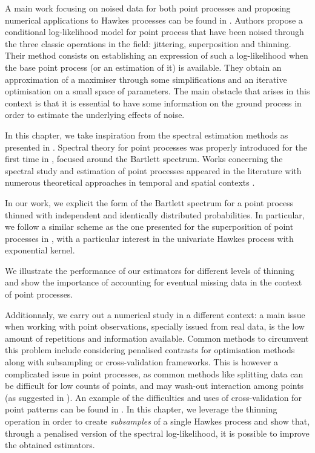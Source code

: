 A main work focusing on noised data for both point processes and proposing numerical applications to Hawkes processes can be found in \textcite{Lund2000}. 
Authors propose a conditional log-likelihood model for point process that have been noised through the three classic operations in the field: jittering, superposition and thinning. 
Their method consists on establishing an expression of such a log-likelihood when the base point process (or an estimation of it) is available.
They obtain an approximation of a maximiser through some simplifications and an iterative optimisation on a small space of parameters.
The main obstacle that arises in this context is that it is essential to have some information on the ground process in order to estimate the underlying effects of noise.

In this chapter, we take inspiration from the spectral estimation methods as presented in \textcite{Cheysson2022, Bonnet2024}.
Spectral theory for point processes was properly introduced for the first time in \textcite{Bartlett1963},
focused around the Bartlett spectrum. 
Works concerning the spectral study and estimation of point processes appeared in the literature with numerous theoretical approaches in temporal and spatial contexts \textcite{Daley1971, Tuan1981, Mugglestone2001, Rajala2023}.

In our work, we explicit the form of the Bartlett spectrum for a point process thinned with independent and identically distributed probabilities. In particular, we follow a similar scheme as the one presented for the superposition of point processes in \textcite{Bonnet2024}, with a particular interest in the univariate Hawkes process with exponential kernel.

We illustrate the performance of our estimators for different levels of thinning and show the importance of accounting for eventual missing data in the context of point processes.

Additionnaly, we carry out a numerical study in a different context:
a main issue when working with point observations, specially issued from real data, is the low amount of repetitions and information available.
Common methods to circumvent this problem include considering penalised contrasts for optimisation methods along with subsampling or cross-validation frameworks. 
This is however a complicated issue in point processes, as common methods like splitting data can be difficult for low counts of points, and may wash-out interaction among points (as suggested in \textcite{Reynaud2014}).
An example of the difficulties and uses of cross-validation for point patterns can be found in \textcite{Cronie2023}.
In this chapter, we leverage the thinning operation in order to create \textit{subsamples} of a single Hawkes process
and show that, through a penalised version of the spectral log-likelihood, 
it is possible to improve the obtained estimators.

